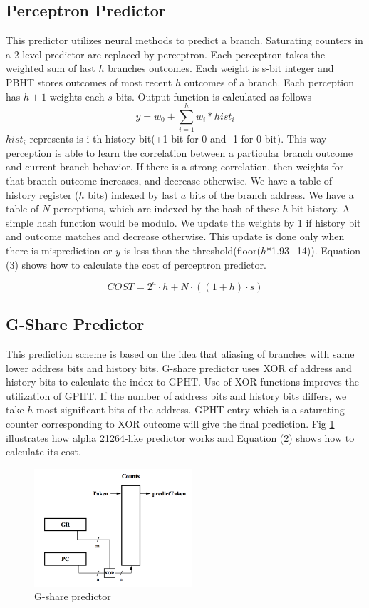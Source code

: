 \documentclass[conference]{IEEEtran}
\begin{document}
\subsection{Perceptron Predictor}
	This predictor utilizes neural methods to predict a branch. Saturating counters in a 2-level predictor are replaced by perceptron. Each perceptron takes the weighted sum of last $h$ branches outcomes. Each weight is s-bit integer and PBHT stores outcomes of most recent $h$ outcomes of a branch. Each perception has $h+1$ weights each $s$ bits. Output function is calculated as follows $$y = w_{0} + \sum_{i=1}^{h} w_{i} * hist_{i}$$
$hist_{i}$ represents is i-th history bit(+1 bit for 0 and -1 for 0 bit). This way perception is able to learn the correlation between a particular branch outcome and current branch behavior. If there is a strong correlation, then weights for that branch outcome increases, and decrease otherwise. We have a table of history register ($h$ bits) indexed by last $a$ bits of the branch address. We have a table of $N$ perceptions, which are indexed by the hash of these $h$ bit history. A simple hash function would be modulo. We update the weights by 1 if history bit and outcome matches and decrease otherwise. This update is done only when there is misprediction or $y$ is less than the threshold(floor($h$*1.93+14)). Equation (3) shows how to calculate the cost of perceptron predictor.

\begin{equation}
    COST = 2^a \cdot h + N \cdot ((1 + h) \cdot s)
    \end{equation}
    
\subsection{G-Share Predictor}
	This prediction scheme is based on the idea that aliasing of branches with same lower address bits and history bits. G-share predictor uses XOR of address and history bits to calculate the index to GPHT. Use of XOR functions improves the utilization of GPHT. If the number of address bits and history bits differs, we take $h$ most significant bits of the address. GPHT entry which is a saturating counter corresponding to XOR outcome will give the final prediction. Fig \ref{gshare_diagram} illustrates how alpha 21264-like predictor works and Equation (2) shows how to calculate its cost.

\begin{figure}[!t]
        \centering
        \includegraphics[width=2.3in]{gshare_diagram}
        \caption{G-share predictor\cite{Gshare2}}
        \label{gshare_diagram}
    \end{figure}
    
\end{document}
